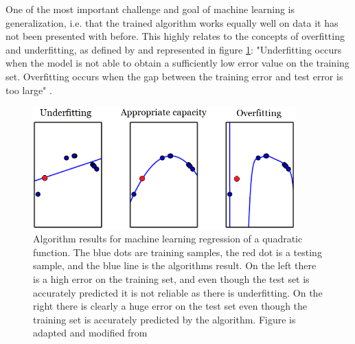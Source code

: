 \documentclass[../main.tex]{subfiles}
\begin{document}
One of the most important challenge and goal of machine learning is generalization, i.e. that the trained algorithm works equally well on data it has not been presented with before. 
This highly relates to the concepts of overfitting and underfitting, as defined by \textcite{Goodfellow2016} and represented in figure \ref{fig:over-vs-under}: "Underﬁtting occurs when the model is not able to obtain a suﬃciently low error value on the training set. Overﬁtting occurs when the gap between the training error and test error is too large" \parencite[109]{Goodfellow2016}.
\begin{figure}[ht]
    \centering
    \includegraphics[width=0.9\textwidth]{img/overfitting-vs-underfitting}
    \caption{Algorithm results for machine learning regression of a quadratic function. The blue dots are training samples, the red dot is a testing sample, and the blue line is the algorithms result. On the left there is a high error on the training set, and even though the test set is accurately predicted it is not reliable as there is underfitting. On the right there is clearly a huge error on the test set even though the training set is accurately predicted by the algorithm. Figure is adapted and modified from \cite[Fig. 5.2]{Goodfellow2016}}
    \label{fig:over-vs-under}
\end{figure}
\end{document}
